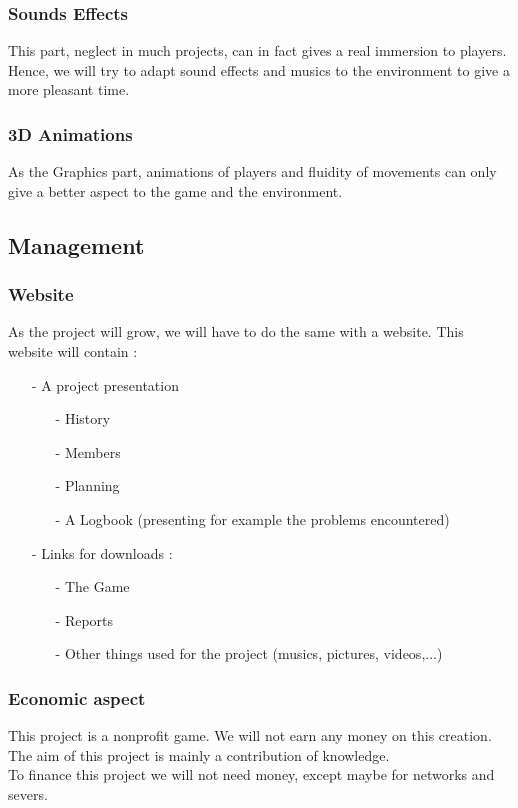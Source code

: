 \documentclass[12pt]{article}
\begin{document}
		\subsubsection{Sounds Effects}
        	This part, neglect in much projects, can in fact gives a real immersion to players. Hence, we will try to adapt sound effects and musics to the environment to give a more pleasant time.
    
   		\subsubsection{3D Animations}
			As the Graphics part, animations of players and fluidity of movements can only give a better aspect to the game and the environment.
    
    \newpage
    
    \subsection{Management}
		\subsubsection{Website}
			As the project will grow, we will have to do the same with a website. This website will contain :		 \begin{itemize}
        	\item[-] A project presentation
         		\begin{itemize}
                	\item[-] History
               		\item[-] Members
                	\item[-] Planning
                	\item[-] A Logbook (presenting for example the problems encountered)
            	\end{itemize}
        	\item[-] Links for downloads :
        		\begin{itemize}
            		\item[-] The Game
                	\item[-] Reports
                	\item[-] Other things used for the project (musics, pictures, videos,...)
            	\end{itemize}
        \end{itemize}           
		
        \subsubsection{Economic aspect}
        	This project is a nonprofit game. We will not earn any money on this creation. The aim of this project is mainly a contribution of knowledge.\\
            To finance this project we will not need money, except maybe for networks and severs.
\end{document}
